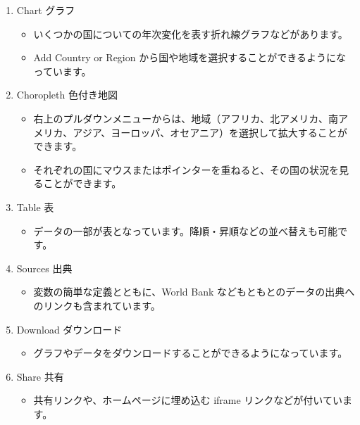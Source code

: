 \documentclass[
  xelatex, ja=standard]{bxjsbook}
\providecommand{\tightlist}{%
  \setlength{\itemsep}{0pt}\setlength{\parskip}{0pt}}
\theoremstyle{definition}
\theoremstyle{definition}
\theoremstyle{definition}
\theoremstyle{definition}
\theoremstyle{remark}
\begin{document}
\begin{enumerate}
\def\labelenumi{\arabic{enumi}.}
\item
  Chart グラフ

  \begin{itemize}
  \item
    いくつかの国についての年次変化を表す折れ線グラフなどがあります。
  \item
    Add Country or Region から国や地域を選択することができるようになっています。
  \end{itemize}
\item
  Choropleth 色付き地図

  \begin{itemize}
  \item
    右上のプルダウンメニューからは、地域（アフリカ、北アメリカ、南アメリカ、アジア、ヨーロッパ、オセアニア）を選択して拡大することができます。
  \item
    それぞれの国にマウスまたはポインターを重ねると、その国の状況を見ることができます。
  \end{itemize}
\item
  Table 表

  \begin{itemize}
  \tightlist
  \item
    データの一部が表となっています。降順・昇順などの並べ替えも可能です。
  \end{itemize}
\item
  Sources 出典

  \begin{itemize}
  \tightlist
  \item
    変数の簡単な定義とともに、World Bank などもともとのデータの出典へのリンクも含まれています。
  \end{itemize}
\item
  Download ダウンロード

  \begin{itemize}
  \tightlist
  \item
    グラフやデータをダウンロードすることができるようになっています。
  \end{itemize}
\item
  Share 共有

  \begin{itemize}
  \tightlist
  \item
    共有リンクや、ホームページに埋め込む iframe リンクなどが付いています。
  \end{itemize}
\end{enumerate}
\end{document}

